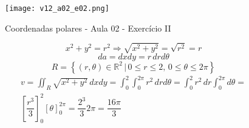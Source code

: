 \begin{enumerate}
	\begin{figure}[htb]
		\caption{Coordenadas polares - Aula 02 - Exercício II}
		\label{v12_a02_e02}
		\centering
		\texttt{[image: v12\_a02\_e02.png]}		
	\end{figure}	
	
	\begin{equation*}
		x^2 + y^2 = r^2 \Rightarrow \sqrt{x^2 + y^2} = \sqrt{r^2} = r
	\end{equation*}
	\begin{equation*}
		da = dx dy = r\, dr d\theta
	\end{equation*}
	\begin{equation*}
		R = \left\{(r, \theta) \in \mathbb{R}^2 \,|\, 0 \leq r \leq 2,\, 0 \leq \theta \leq 2\pi\right\}
	\end{equation*}
	\begin{align*}
		v = \iint_R \sqrt{x^2 + y^2}\, dxdy = \int_0^2 \int_0^{2\pi} r^2\, drd\theta = \int_0^2 r^2\, dr \int_0^{2\pi} d\theta =\\ \left[\dfrac{r^3}{3}\right]_0^2 [\theta]_0^{2\pi} = \dfrac{2^3}{3}2\pi = \dfrac{16\pi}{3}
	\end{align*}
\end{enumerate}